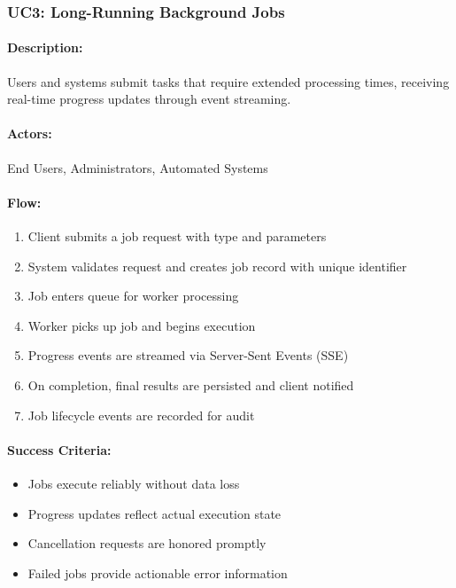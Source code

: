 \subsubsection{UC3: Long-Running Background Jobs}

\paragraph{Description:} Users and systems submit tasks that require extended processing times, receiving real-time progress updates through event streaming.

\paragraph{Actors:} End Users, Administrators, Automated Systems

\paragraph{Flow:}
\begin{enumerate}
    \item Client submits a job request with type and parameters
    \item System validates request and creates job record with unique identifier
    \item Job enters queue for worker processing
    \item Worker picks up job and begins execution
    \item Progress events are streamed via Server-Sent Events (SSE)
    \item On completion, final results are persisted and client notified
    \item Job lifecycle events are recorded for audit
\end{enumerate}

\paragraph{Success Criteria:}
\begin{itemize}
    \item Jobs execute reliably without data loss
    \item Progress updates reflect actual execution state
    \item Cancellation requests are honored promptly
    \item Failed jobs provide actionable error information
\end{itemize}

